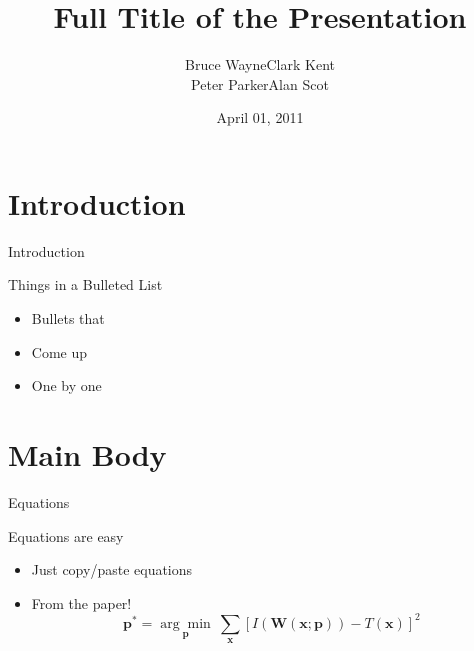 \documentclass[handout]{beamer}
\title
  [Short Title\hspace{2em}]
  {Full Title of the Presentation}
\author
  [Bruce Wayne]
  {Bruce Wayne\quad Clark Kent\\Peter Parker\quad Alan Scot}
\date
  {April 01, 2011}
\institute
  {Justice League of America}
\begin{document}
\maketitle

\section
  {Introduction}

\begin{frame}
  {Introduction}

  Things in a Bulleted List\pause

  \begin{itemize}
  \item Bullets that\pause
  \item Come up\pause
  \item One by one
  \end{itemize}
\end{frame}



\section
  {Main Body}

\begin{frame}
  {Equations}

  Equations are easy
  \begin{itemize}
  \item Just copy/paste equations\pause
  \item From the paper!
    \begin{equation*}
      \textbf{p}^* = \underset{\textbf{p}}{\arg\!\min}~\sum_{\textbf{x}}\left[ I(\textbf{W}(\textbf{x};\textbf{p})) - T(\textbf{x}) \right]^2
    \end{equation*}
  \end{itemize}
\end{frame}
\end{document}
